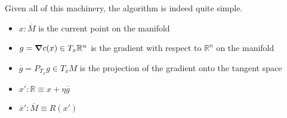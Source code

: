 \documentclass[11pt]{book}
\begin{document}
Given all of this machinery, the algorithm is indeed quite simple. 

\begin{itemize}
    \item $x: \overline M$ is the current point on the manifold
    \item $g = \grad c(x) \in T_x \mathbb R^n$ is the gradient with respect to $\mathbb R^n$ on the manifold
    \item $\overline g = P_{T_x} g \in T_x M$ is the projection of the gradient onto the tangent
            space
    \item $x': \mathbb R \equiv x + \eta \overline g$
    \item $\overline x': \overline M \equiv R(x')$
\end{itemize}
\end{document}
